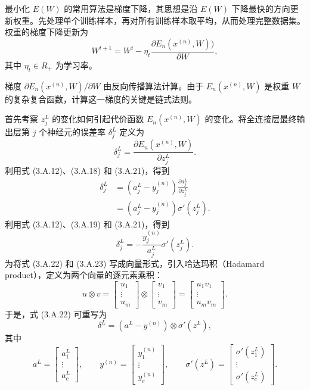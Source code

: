 最小化 $E(W)$ 的常用算法是梯度下降，其思想是沿 $E(W)$ 下降最快的方向更新权重。先处理单个训练样本，再对所有训练样本取平均，从而处理完整数据集。权重的梯度下降更新为
\begin{equation}
W^{t+1}=W^t-\eta_t\frac{\partial E_n(x^{(n)},W))}{\partial W},
\tag{3.A.20}
\end{equation}
其中 $\eta_t\in R_+$ 为学习率。

梯度 $\partial E_n(x^{(n)},W)/\partial W$ 由反向传播算法计算。由于 $E_n(x^{(n)},W)$ 是权重 $W$ 的复杂复合函数，计算这一梯度的关键是链式法则。

首先考察 $z_j^L$ 的变化如何引起代价函数 $E_n(x^{(n)},W)$ 的变化。将全连接层最终输出层第 $j$ 个神经元的误差率 $\delta_j^L$ 定义为
\begin{equation}
\delta_j^L=\frac{\partial E_n(x^{(n)},W)}{\partial z_j^L}.
\tag{3.A.21}
\end{equation}
利用式 (3.A.12)、(3.A.18) 和 (3.A.21)，得到
\begin{equation}
\begin{aligned}
\delta_j^L&=(a_j^L-y_j^{(n)})\frac{\partial a_j^L}{\partial z_j^L}\\
&=(a_j^L-y_j^{(n)})\sigma'(z_j^L).
\end{aligned}
\tag{3.A.22}
\end{equation}
利用式 (3.A.12)、(3.A.19) 和 (3.A.21)，得到
\begin{equation}
\delta_j^L=-\frac{y_j^{(n)}}{a_j^L}\sigma'(z_j^L).
\tag{3.A.23}
\end{equation}
为将式 (3.A.22) 和 (3.A.23) 写成向量形式，引入哈达玛积（Hadamard product），定义为两个向量的逐元素乘积：
\begin{equation}
u\otimes v=\begin{bmatrix}u_1\\\vdots\\u_m\end{bmatrix}
\otimes\begin{bmatrix}v_1\\\vdots\\v_m\end{bmatrix}
=\begin{bmatrix}u_1v_1\\\vdots\\u_mv_m\end{bmatrix}.
\tag{3.A.24}
\end{equation}
于是，式 (3.A.22) 可重写为
\begin{equation}
\delta^L=(a^L-y^{(n)})\otimes\sigma'(z^L),
\tag{3.A.25}
\end{equation}
其中
\[
a^L=\begin{bmatrix}a_1^L\\\vdots\\a_c^L\end{bmatrix},\qquad
y^{(n)}=\begin{bmatrix}y_1^{(n)}\\\vdots\\y_c^{(n)}\end{bmatrix},\qquad
\sigma'(z^L)=\begin{bmatrix}\sigma'(z_1^L)\\\vdots\\\sigma'(z_c^L)\end{bmatrix}.
\]

